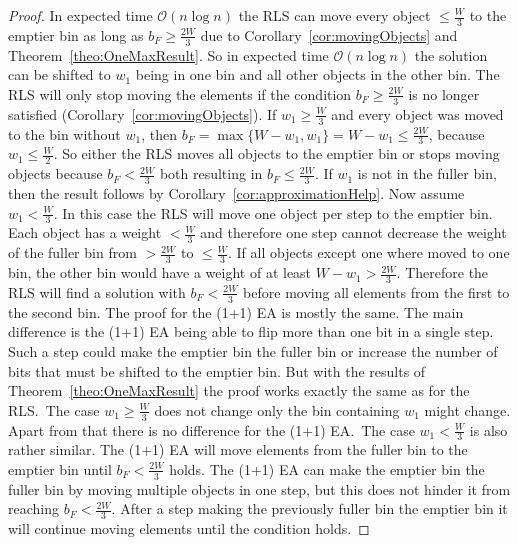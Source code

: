 \begin{proof}
    In expected time $\mathcal{O}(n\log{}n)$ the RLS can move every object $\le \frac{W}{3}$ to the emptier bin as long as $b_F \ge \frac{2W}{3}$ due to Corollary~\ref{cor:movingObjects} and Theorem~\ref{theo:OneMaxResult}.
    So in expected time $\mathcal{O}(n\log{}n)$ the solution can be shifted to $w_1$ being in one bin and all other objects in the other bin.
    The RLS will only stop moving the elements if the condition $b_F \ge \frac{2W}{3}$ is no longer satisfied (Corollary~\ref{cor:movingObjects}).
    If \(w_1 \ge \frac{W}{3}\) and every object was moved to the bin without $w_1$, then \(b_F = \max\{W-w_1, w_1\} = W-w_1 \le \frac{2W}{3}\), because \(w_1 \le \frac{W}{2}\).
    So either the RLS moves all objects to the emptier bin or stops moving objects because $b_F < \frac{2W}{3}$ both resulting in $b_F \le \frac{2W}{3}$.
    If $w_1$ is not in the fuller bin, then the result follows by Corollary~\ref{cor:approximationHelp}.\newline
    Now assume \(w_1 < \frac{W}{3}\).
    In this case the RLS will move one object per step to the emptier bin.
    Each object has a weight $< \frac{W}{3}$ and therefore one step cannot decrease the weight of the fuller bin from $> \frac{2W}{3}$ to $\le \frac{W}{3}$.
    If all objects except one where moved to one bin, the other bin would have a weight of at least \(W-w_1 > \frac{2W}{3}\).
    Therefore the RLS will find a solution with $b_F < \frac{2W}{3}$ before moving all elements from the first to the second bin.\newline
    The proof for the (1+1) EA is mostly the same.
    The main difference is the (1+1) EA being able to flip more than one bit in a single step.
    Such a step could make the emptier bin the fuller bin or increase the number of bits that must be shifted to the emptier bin.
    But with the results of Theorem~\ref{theo:OneMaxResult} the proof works exactly the same as for the RLS.\
    The case \(w_1 \ge \frac{W}{3}\) does not change only the bin containing $w_1$ might change.
    Apart from that there is no difference for the (1+1) EA.\
    The case $w_1 < \frac{W}{3}$ is also rather similar.
    The (1+1) EA will move elements from the fuller bin to the emptier bin until $b_F < \frac{2W}{3}$ holds. The (1+1) EA can make the emptier bin the fuller bin by moving multiple objects in one step, but this does not hinder it from reaching $b_F < \frac{2W}{3}$.
    After a step making the previously fuller bin the emptier bin it will continue moving elements until the condition holds.
\end{proof}

